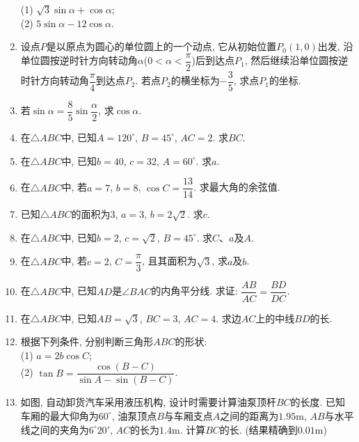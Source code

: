 \documentclass[10pt,a4paper]{article}
\begin{document}
\begin{enumerate}[1.]
(1) $\sqrt 3\sin \alpha+\cos \alpha$;\\
(2) $5\sin \alpha-12\cos \alpha$.
\item 设点$P$是以原点为圆心的单位圆上的一个动点, 它从初始位置$P_0(1, 0)$出发, 沿单位圆按逆时针方向转动角$\alpha$($0<\alpha<\dfrac \pi 2$)后到达点$P_1$, 然后继续沿单位圆按逆时针方向转动角$\dfrac \pi 4$到达点$P_2$. 若点$P_2$的横坐标为$-\dfrac 35$, 求点$P_1$的坐标.
\item 若$\sin \alpha=\dfrac 85\sin \dfrac \alpha 2$, 求$\cos \alpha$.
\item 在$\triangle ABC$中, 已知$A=120^\circ$, $B=45^\circ$, $AC=2$. 求$BC$.
\item 在$\triangle ABC$中, 已知$b=40$, $c=32$, $A=60^\circ$. 求$a$.
\item 在$\triangle ABC$中, 若$a=7$, $b=8$, $\cos C=\dfrac{13}{14}$. 求最大角的余弦值.
\item 已知$\triangle ABC$的面积为$3$, $a=3$, $b=2\sqrt 2$. 求$c$.
\item 在$\triangle ABC$中, 已知$b=2$, $c=\sqrt 2$, $B=45^\circ$. 求$C$、$a$及$A$.
\item 在$\triangle ABC$中, 若$c=2$, $C=\dfrac\pi 3$, 且其面积为$\sqrt 3$, 求$a$及$b$.
\item 在$\triangle ABC$中, 已知$AD$是$\angle BAC$的内角平分线. 求证: $ \dfrac{AB}{AC}=\dfrac{BD}{DC}$.
\item 在$\triangle ABC$中, 已知$AB=\sqrt 3$, $BC=3$, $AC=4$. 求边$AC$上的中线$BD$的长.
\item 根据下列条件, 分别判断三角形$ABC$的形状:\\
(1) $a=2b\cos C$;\\
(2) $\tan B=\dfrac{\cos (B-C)}{\sin A-\sin (B-C)}$.
\item 如图, 自动卸货汽车采用液压机构, 设计时需要计算油泵顶杆$BC$的长度. 已知车厢的最大仰角为$60^\circ$, 油泵顶点$B$与车厢支点$A$之间的距离为$1.95\text{m}$, $AB$与水平线之间的夹角为$6^\circ 20'$, $AC$的长为$1.4\text{m}$. 计算$BC$的长. (结果精确到$0.01\text{m}$)
\begin{center}
\end{center}
\end{enumerate}
\end{document}
